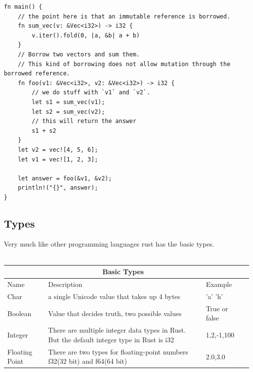 \documentclass{article}
\theoremstyle{theorem}
\theoremstyle{definition}
\theoremstyle{remark}
\begin{document}
\begin{lstlisting}
fn main() {
    // the point here is that an immutable reference is borrowed.
    fn sum_vec(v: &Vec<i32>) -> i32 {
        v.iter().fold(0, |a, &b| a + b)
    }
    // Borrow two vectors and sum them.
    // This kind of borrowing does not allow mutation through the borrowed reference.
    fn foo(v1: &Vec<i32>, v2: &Vec<i32>) -> i32 {
        // we do stuff with `v1` and `v2`.
        let s1 = sum_vec(v1);
        let s2 = sum_vec(v2);
        // this will return the answer
        s1 + s2
    }
    let v2 = vec![4, 5, 6];
    let v1 = vec![1, 2, 3];
    
    let answer = foo(&v1, &v2);
    println!("{}", answer);
}
\end{lstlisting}


\subsection{Types}

Very much like other programming languages rust has the basic types. \cite{G4G} 
 \\ 
  \\ 
\begin{center}
\begin{tabular}{ |p{5cm}||p{5cm}|p{5cm}|p{5cm}|  }
 \hline
 \multicolumn{3}{|c|}{Basic Types} \\
 \hline
 Name & Description & Example\\
 \hline
 Char   &  a single Unicode value that takes up 4 bytes
    &'a' 'h' \\
     \hline
 Boolean &  Value that decides truth, two possible values & True or false  \\
  \hline
 Integer &There are multiple integer data types in Rust. But the default integer type in Rust is i32
 & 1,2,-1,100\\
  \hline
 Floating Point    &There are two types for floating-point numbers f32(32 bit) and f64(64 bit) & 2.0,3.0\\
 \hline
\end{tabular}
\end{center}
\end{document}
